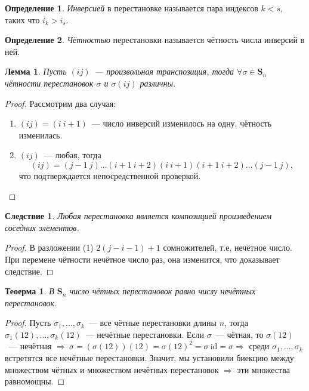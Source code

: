 \documentclass[a4paper, 14pt]{extarticle}
\newcommand{\symmetrical}{\mathbf{S}}
\newcommand{\id}{\mathrm{id}}
\theoremstyle{definition}
\newtheorem{definition}{Определение}
\theoremstyle{plain}
\newtheorem{theorem}{Теоерма}
\numberwithin{theorem}{section}
\numberwithin{definition}{section}
\numberwithin{statement}{section}
\newtheorem{lemma}{Лемма}
\numberwithin{lemma}{section}
\newtheorem*{consequence*}{Следствие}
\numberwithin{consequence}{section}
\begin{document}
        \begin{definition}
        \textit{Инверсией} в перестановке называется пара индексов $k < s$, таких что $i_k > i_s$.
        \end{definition}
        \begin{definition}
            \textit{Чётностью} перестановки называется чётность числа инверсий в ней.
        \end{definition}
        \begin{lemma}
            Пусть $(ij)$~--- произвольная транспозиция, тогда ${\forall \sigma \in \symmetrical_n}$ чётности перестановок $\sigma$ и $\sigma (ij)$ различны.
        \end{lemma}
        \begin{proof}
            Рассмотрим два случая:
            \begin{enumerate}
                \setlength\itemsep{0.1em}
                \item $(ij) = (i \ i+1)$~--- число инверсий изменилось на одну, чётность изменилась.
                \item $(ij)$~--- любая, тогда
                \begin{equation}
                    (ij) = (j-1 \ j)\ldots(i+1 \ i+2)(i \ i+1)(i+1 \ i+2)\ldots(j-1 \ j),
                \end{equation}
                что подтверждается непосредственной проверкой. \qedhere
            \end{enumerate}
        \end{proof}
        \begin{consequence*}
            Любая перестановка является композицией произведением соседних элементов.
        \end{consequence*}
        \begin{proof}
            В разложении (1) $2(j - i - 1) + 1$ сомножителей, т.е, нечётное число. При перемене чётности нечётное число раз, она изменится, что доказывает следствие.
        \end{proof}
        \begin{theorem}
            В $\symmetrical_n$ число чётных перестановок равно числу нечётных перестановок.
        \end{theorem}
        \begin{proof}
            Пусть $\sigma_1,\ldots,\sigma_k$~--- все чётные перестановки длины $n$, тогда $\sigma_1(12),\ldots,\sigma_k(12)$~--- нечётные перестановки. Если $\sigma$~--- чётная, то $\sigma (12)$~--- нечётная $\Longrightarrow \ {\sigma = (\sigma (12))(12) = \sigma (12)^2 = \sigma \ \id = \sigma} \Longrightarrow$ среди $\sigma_1,\ldots,\sigma_k$ встретятся все нечётные перестановки. Значит, мы установили биекцию между множеством чётных и множеством нечётных перестановок $\Longrightarrow$ эти множества равномощны.
        \end{proof}
\end{document}
